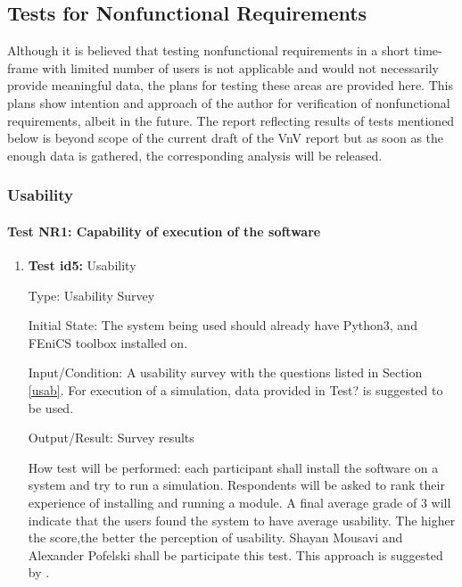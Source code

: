 \documentclass[12pt, titlepage]{article}
\begin{document}
\subsection{Tests for Nonfunctional Requirements}
\label{nonfunc}
Although it is believed that testing nonfunctional requirements in a short time-frame with limited number of users is not applicable and would not necessarily provide meaningful data, the plans for testing these areas are provided here. This plans show intention and approach of the author for verification of nonfunctional requirements, albeit in the future. The report reflecting results of tests mentioned below is beyond scope of the current draft of the VnV report but as soon as the enough data is gathered, the corresponding analysis will be released.    
 
\subsubsection{Usability}

		
\paragraph{Test NR1: Capability of execution of the software}

\begin{enumerate}

\item{\textbf{Test id5:} Usability \\}

Type: Usability Survey
					
Initial State: The system being used should already have Python3, and FEniCS toolbox installed on.  
					
Input/Condition: A usability survey with the questions listed in Section \ref{usab}. For execution of a simulation, data provided in Test? is suggested to be used.
					
Output/Result: Survey results
					
How test will be performed: each participant shall install the software on a system and try to run a simulation. Respondents will be asked to rank their experience of installing and running a module. A final average grade of 3 will indicate that the users found the system to have average usability. The higher the score,the better the perception of usability. Shayan Mousavi and Alexander Pofelski shall be participate this test. This approach is suggested by \cite{LatticeB41:online}.

\end{enumerate}
\end{document}
